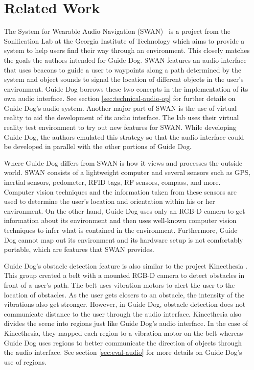 \section{Related Work}
\label{sec:related}


The System for Wearable Audio Navigation (SWAN)~\cite{swan-website} is a project
from the Sonification Lab at the Georgia Institute of Technology which aims to
provide a system to help users find their way through an environment. This
closely matches the goals the authors intended for Guide Dog. SWAN features an
audio interface that uses beacons to guide a user to waypoints along a path
determined by the system and object sounds to signal the location of different
objects in the user's environment. Guide Dog borrows these two concepts in the
implementation of its own audio interface. See section
\ref{sec:technical-audio-op} for further details on Guide Dog's audio system.
Another major part of SWAN is the use of virtual reality to aid the development
of its audio interface. The lab uses their virtual reality test environment to
try out new features for SWAN. While developing Guide Dog, the authors emulated
this strategy so that the audio interface could be developed in parallel with
the other portions of Guide Dog.

Where Guide Dog differs from SWAN is how it views and processes the outside
world. SWAN consists of a lightweight computer and several sensors such as GPS,
inertial sensors, pedometer, RFID tags, RF sensors, compass, and more.
Computer vision techniques and the information taken from these sensors are used to
determine the user's location and orientation within his or her environment. On
the other hand, Guide Dog uses only an RGB-D camera to get information about its
environment and then uses well-known computer vision techniques to infer what is
contained in the environment. Furthermore, Guide Dog cannot map out its
environment and its hardware setup is not comfortably portable, which are
features that SWAN provides.

Guide Dog's obstacle detection feature is also similar to the project Kinecthesia
\cite{kinecthesia-website}. This group created a belt with a mounted RGB-D
camera to detect obstacles in front of a user's path. The belt uses vibration
motors to alert the user to the location of obstacles. As the user gets closers
to an obstacle, the intensity of the vibrations also get stronger. However, in
Guide Dog, obstacle detection does not communicate distance to the user through
the audio interface. Kinecthesia also divides the
scene into regions just like Guide Dog's audio interface. In the case of
Kinecthesia, they mapped each region to a vibration motor on the belt whereas
Guide Dog uses regions to better communicate the direction of objects through
the audio interface. See section \ref{sec:eval-audio} for more details on Guide
Dog's use of regions.

